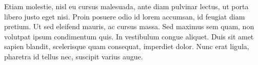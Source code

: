 \documentclass[a4paper,fleqn,spanish]{cas-dc}
\begin{document}
Etiam molestie, nisl eu cursus malesuada, ante diam pulvinar lectus, ut porta
libero justo eget nisi. Proin posuere odio id lorem accumsan, id feugiat diam
pretium. Ut sed eleifend mauris, ac cursus massa. Sed maximus sem quam, non
volutpat ipsum condimentum quis. In vestibulum congue aliquet. Duis sit amet
sapien blandit, scelerisque quam consequat, imperdiet dolor. Nunc erat ligula,
pharetra id tellus nec, suscipit varius augue.




%
%

%



%
\end{document}
